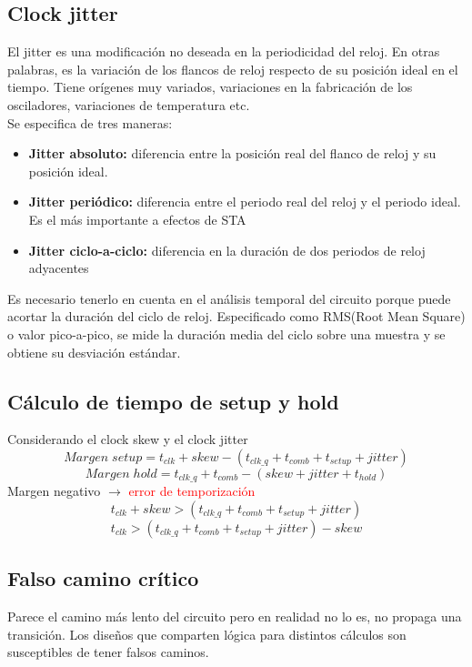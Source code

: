 \subsection{Clock jitter}
El jitter es una modificación no deseada en la periodicidad del reloj. En otras palabras, es la variación de los flancos de reloj respecto de su posición ideal en el tiempo.
Tiene orígenes muy variados, variaciones en la fabricación de los osciladores, variaciones de temperatura etc.\\
Se especifica de tres maneras:
\begin{itemize}
	\item\textbf{Jitter absoluto:} diferencia entre la posición real del flanco de reloj y su posición ideal.
	\item\textbf{Jitter periódico:} diferencia entre el periodo real del reloj y el periodo ideal. Es el más importante a efectos de STA
	\item\textbf{Jitter ciclo-a-ciclo:} diferencia en la duración de dos periodos de reloj adyacentes
\end{itemize}

Es necesario tenerlo en cuenta en el análisis temporal del circuito porque puede acortar la duración del ciclo de reloj. Especificado como RMS(Root Mean Square) o valor pico-a-pico, se mide la duración media del ciclo sobre una muestra y se obtiene su desviación estándar.

\subsection{Cálculo de tiempo de setup y hold}
Considerando el clock skew y el clock jitter
\[
	Margen\; setup = t_{clk} + skew - \left(t_{clk\_q} + t_{comb} + t_{setup} + jitter\right)
\]
\[
	Margen\; hold = t_{clk\_q} + t_{comb} - \left(skew + jitter + t_{hold}\right)
\]
Margen negativo $\rightarrow$ \textcolor{red}{error de temporización}
\[
	t_{clk} + skew > \left(t_{clk\_q} + t_{comb} + t_{setup} + jitter\right)
\]
\[
	t_{clk} > \left(t_{clk\_q} + t_{comb} + t_{setup} + jitter\right) -skew
\]

\subsection{Falso camino crítico}
Parece el camino más lento del circuito pero en realidad no lo es, no propaga una transición. Los diseños que comparten lógica para distintos cálculos son susceptibles de tener falsos caminos.

